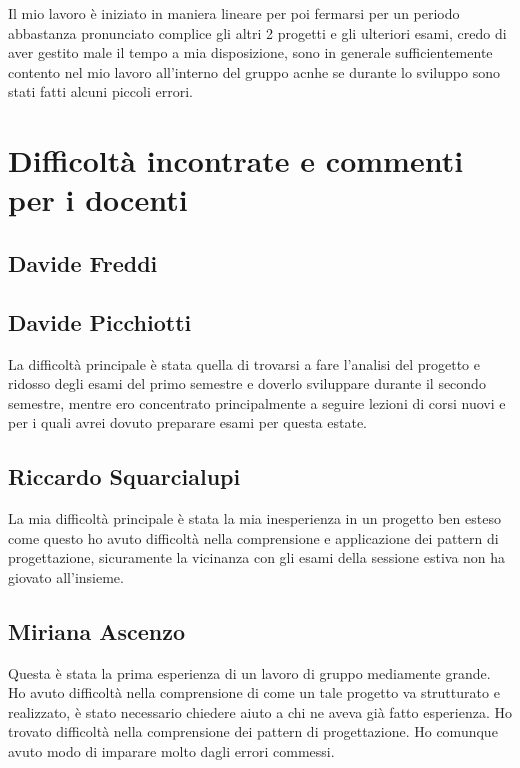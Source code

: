 \documentclass[a4paper,12pt]{report}
\begin{document}
     Il mio lavoro è iniziato in maniera lineare per poi fermarsi per un periodo abbastanza pronunciato complice gli altri 2 progetti e gli ulteriori esami, credo di aver gestito male il tempo a mia disposizione, sono in generale sufficientemente contento nel mio lavoro all'interno del gruppo acnhe se durante lo sviluppo sono stati fatti alcuni piccoli errori.

    \section{Difficoltà incontrate e commenti per i docenti}

	\subsection{Davide Freddi}
	\subsection{Davide Picchiotti}
    La difficoltà principale è stata quella di trovarsi a fare l'analisi del progetto e ridosso degli esami del primo semestre e doverlo sviluppare
    durante il secondo semestre, mentre ero concentrato principalmente a seguire lezioni di corsi nuovi e per i quali avrei dovuto preparare esami per questa estate.

    \subsection{Riccardo Squarcialupi}
	La mia difficoltà principale è stata la mia inesperienza in un progetto ben esteso come questo ho avuto difficoltà nella comprensione e applicazione dei pattern di progettazione, sicuramente la vicinanza con gli esami della sessione estiva non ha giovato all'insieme.
    \subsection{Miriana Ascenzo}
    Questa è stata la prima esperienza di un lavoro di gruppo mediamente grande.
    Ho avuto difficoltà nella comprensione di come un tale progetto va strutturato e realizzato, è stato necessario chiedere aiuto a chi ne aveva già fatto esperienza.
    Ho trovato difficoltà nella comprensione dei pattern di progettazione.
    Ho comunque avuto modo di imparare molto dagli errori commessi.
\end{document}
